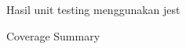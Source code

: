 \begin{figure}[h]
  {\par}
  \caption{Hasil unit testing menggunakan jest}
  \label{unit-testing}
\end{figure}

\begin{figure}[h]
  {\par}
  \caption{Coverage Summary}
  \label{coverage-summary}
\end{figure}

\newpage

